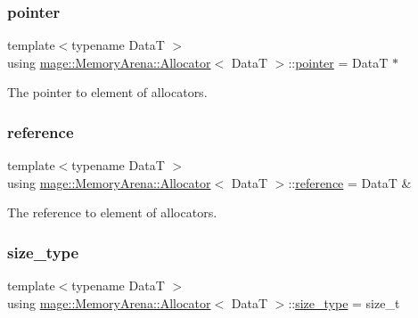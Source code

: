 \subsubsection{\texorpdfstring{pointer}{pointer}}
{\footnotesize\ttfamily template$<$typename DataT $>$ \\
using \hyperlink{structmage_1_1_memory_arena_1_1_allocator}{mage\+::\+Memory\+Arena\+::\+Allocator}$<$ DataT $>$\+::\hyperlink{structmage_1_1_memory_arena_1_1_allocator_a06c19054bb02d7e7c982434c47f19adf}{pointer} =  DataT $\ast$}

The pointer to element of allocators. \hypertarget{structmage_1_1_memory_arena_1_1_allocator_afeac56ef7ef38b63f56161988f59ef32}{}\label{structmage_1_1_memory_arena_1_1_allocator_afeac56ef7ef38b63f56161988f59ef32} 
\subsubsection{\texorpdfstring{reference}{reference}}
{\footnotesize\ttfamily template$<$typename DataT $>$ \\
using \hyperlink{structmage_1_1_memory_arena_1_1_allocator}{mage\+::\+Memory\+Arena\+::\+Allocator}$<$ DataT $>$\+::\hyperlink{structmage_1_1_memory_arena_1_1_allocator_afeac56ef7ef38b63f56161988f59ef32}{reference} =  DataT \&}

The reference to element of allocators. \hypertarget{structmage_1_1_memory_arena_1_1_allocator_ae9b21f77ba4d93a7c8f5ed3097bd6f8e}{}\label{structmage_1_1_memory_arena_1_1_allocator_ae9b21f77ba4d93a7c8f5ed3097bd6f8e} 
\subsubsection{\texorpdfstring{size\+\_\+type}{size\_type}}
{\footnotesize\ttfamily template$<$typename DataT $>$ \\
using \hyperlink{structmage_1_1_memory_arena_1_1_allocator}{mage\+::\+Memory\+Arena\+::\+Allocator}$<$ DataT $>$\+::\hyperlink{structmage_1_1_memory_arena_1_1_allocator_ae9b21f77ba4d93a7c8f5ed3097bd6f8e}{size\+\_\+type} =  size\+\_\+t}

